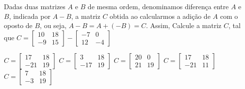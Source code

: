 Dadas duas matrizes $A$ e $B$ de mesma ordem, denominamos diferença entre $A$ e $B$, indicada por $A-B$, a matriz $C$ obtida ao calcularmos a adição de $A$ com o oposto de $B$, ou seja, $A-B=A+(-B)=C$. Assim, Calcule a matriz $C$, tal que $C=\left[ \begin{array}{cc}
10 & 18 \\
-9 & 15
\end{array} \right] - \left[ \begin{array}{cc}
-7 & 0 \\
12 & -4
\end{array} \right]$

$C=\left[ \begin{array}{cc}	17 & 18 \\	-21 & 19 \end{array} \right]$
$C=\left[ \begin{array}{cc}	3 & 18 \\	-17 & 19 \end{array} \right]$
$C=\left[ \begin{array}{cc}	20 & 0 \\	21 & 19 \end{array} \right]$
$C=\left[ \begin{array}{cc}	17 & 18 \\	-21 & 11 \end{array} \right]$
$C=\left[ \begin{array}{cc}	7 & 18 \\	-3 & 19 \end{array} \right]$


